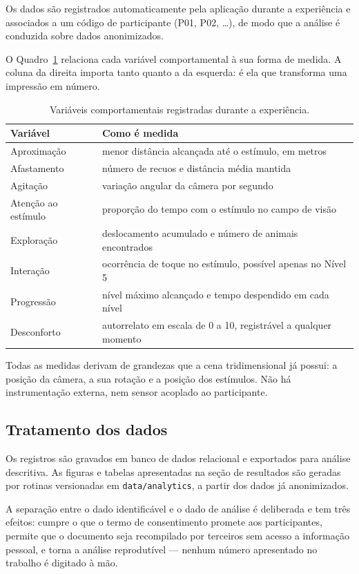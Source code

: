 Os dados são registrados automaticamente pela aplicação durante a
experiência e associados a um código de participante (P01, P02, \ldots),
de modo que a análise é conduzida sobre dados anonimizados.

O Quadro~\ref{tab:variaveis} relaciona cada variável comportamental à sua
forma de medida. A coluna da direita importa tanto quanto a da esquerda:
é ela que transforma uma impressão em número.

\begin{table}[htbp]
\centering
\caption{Variáveis comportamentais registradas durante a experiência.}
\label{tab:variaveis}
\begin{tabular}{p{3.4cm}p{9.4cm}}
\toprule
\textbf{Variável} & \textbf{Como é medida} \\
\midrule
Aproximação     & menor distância alcançada até o estímulo, em metros \\
Afastamento     & número de recuos e distância média mantida \\
Agitação        & variação angular da câmera por segundo \\
Atenção ao estímulo & proporção do tempo com o estímulo no campo de visão \\
Exploração      & deslocamento acumulado e número de animais encontrados \\
Interação       & ocorrência de toque no estímulo, possível apenas no Nível 5 \\
Progressão      & nível máximo alcançado e tempo despendido em cada nível \\
Desconforto     & autorrelato em escala de 0 a 10, registrável a qualquer momento \\
\bottomrule
\end{tabular}
\end{table}

Todas as medidas derivam de grandezas que a cena tridimensional já
possui: a posição da câmera, a sua rotação e a posição dos estímulos. Não
há instrumentação externa, nem sensor acoplado ao participante.

\subsection{Tratamento dos dados}

Os registros são gravados em banco de dados relacional e exportados para
análise descritiva. As figuras e tabelas apresentadas na seção de
resultados são geradas por rotinas versionadas em
\texttt{data/analytics}, a partir dos dados já anonimizados.

A separação entre o dado identificável e o dado de análise é deliberada e
tem três efeitos: cumpre o que o termo de consentimento promete aos
participantes, permite que o documento seja recompilado por terceiros sem
acesso a informação pessoal, e torna a análise reprodutível --- nenhum
número apresentado no trabalho é digitado à mão.
